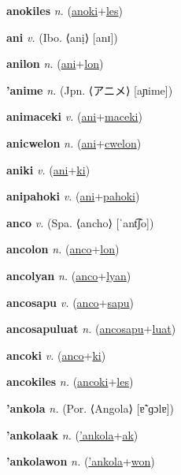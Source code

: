 \textbf{\hypertarget{anokiles}{anokiles}} \textit{n.} (\hyperlink{anoki}{anoki}+\allowbreak \hyperlink{les}{les})


\textbf{\hypertarget{ani}{ani}} \textit{v.} (Ibo. ⟨anị⟩ [anɪ])


\textbf{\hypertarget{anilon}{anilon}} \textit{n.} (\hyperlink{ani}{ani}+\allowbreak \hyperlink{lon}{lon})


\textbf{\hypertarget{'anime}{'anime}} \textit{n.} (Jpn. ⟨{\japanese{}アニメ}⟩ [aɲime])


\textbf{\hypertarget{animaceki}{animaceki}} \textit{v.} (\hyperlink{ani}{ani}+\allowbreak \hyperlink{maceki}{maceki})


\textbf{\hypertarget{anicwelon}{anicwelon}} \textit{n.} (\hyperlink{ani}{ani}+\allowbreak \hyperlink{cwelon}{cwelon})


\textbf{\hypertarget{aniki}{aniki}} \textit{v.} (\hyperlink{ani}{ani}+\allowbreak \hyperlink{ki}{ki})


\textbf{\hypertarget{anipahoki}{anipahoki}} \textit{v.} (\hyperlink{ani}{ani}+\allowbreak \hyperlink{pahoki}{pahoki})


\textbf{\hypertarget{anco}{anco}} \textit{v.} (Spa. ⟨ancho⟩ [ˈant͡ʃo])


\textbf{\hypertarget{ancolon}{ancolon}} \textit{n.} (\hyperlink{anco}{anco}+\allowbreak \hyperlink{lon}{lon})


\textbf{\hypertarget{ancolyan}{ancolyan}} \textit{n.} (\hyperlink{anco}{anco}+\allowbreak \hyperlink{lyan}{lyan})


\textbf{\hypertarget{ancosapu}{ancosapu}} \textit{v.} (\hyperlink{anco}{anco}+\allowbreak \hyperlink{sapu}{sapu})


\textbf{\hypertarget{ancosapuluat}{ancosapuluat}} \textit{n.} (\hyperlink{ancosapu}{ancosapu}+\allowbreak \hyperlink{luat}{luat})


\textbf{\hypertarget{ancoki}{ancoki}} \textit{v.} (\hyperlink{anco}{anco}+\allowbreak \hyperlink{ki}{ki})


\textbf{\hypertarget{ancokiles}{ancokiles}} \textit{n.} (\hyperlink{ancoki}{ancoki}+\allowbreak \hyperlink{les}{les})


\textbf{\hypertarget{'ankola}{'ankola}} \textit{n.} (Por. ⟨Angola⟩ [ɐ̃ˈɡɔlɐ])


\textbf{\hypertarget{'ankolaak}{'ankolaak}} \textit{n.} (\hyperlink{'ankola}{'ankola}+\allowbreak \hyperlink{ak}{ak})


\textbf{\hypertarget{'ankolawon}{'ankolawon}} \textit{n.} (\hyperlink{'ankola}{'ankola}+\allowbreak \hyperlink{won}{won})


